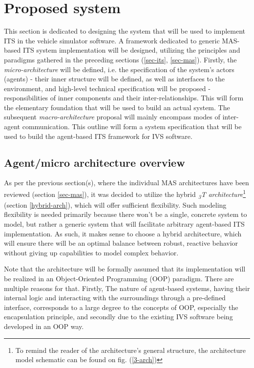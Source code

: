 \documentclass[main.tex]{subfiles}
\begin{document}
    
\section{Proposed system}\label{sec-system}

This section is dedicated to designing the system that will be used to implement ITS in the
vehicle simulator software. A framework dedicated to generic MAS-based ITS system
implementation will be designed, utilizing the principles and paradigms gathered in the
preceding sections (\ref{sec-its}, \ref{sec-mas}). Firstly, the \emph{micro-architecture} will be
defined, i.e. the specification of the system's actors (agents) - their inner structure 
will be defined, as well as interfaces to the environment, and high-level technical specification 
will be proposed - responsibilities of inner components and their inter-relationships.
This will form the elementary foundation that will be used to build an actual system.
The subsequent \emph{macro-architecture} proposal will mainly encompass modes of inter-
agent communication. This outline will form a system specification that will be used 
to build the agent-based ITS framework for IVS software.

\subsection{Agent/micro architecture overview}

As per the previous section(s), where the individual MAS architectures have been reviewed
(section \ref{sec-mas}), it was decided to utilize the hybrid \emph{\textsubscript{3}T
architecture}\footnote{To remind the reader of the architecture's general structure, the
architecture model schematic can be found on fig. (\ref{3-arch}) } (section \ref{hybrid-arch}),
which will offer sufficient flexibility.  Such modeling flexibility is needed primarily because
there won't be a single, concrete system to model, but rather a generic system that will
facilitate arbitrary agent-based ITS implementation. As such, it makes sense to choose a hybrid
architecture, which will ensure there will be an optimal balance between robust, reactive
behavior without giving up capabilities to model complex behavior.

Note that the architecture will be formally assumed that its implementation will be realized 
in an Object-Oriented Programming (OOP) paradigm. There are multiple reasons for that. Firstly, 
The nature of agent-based systems, having their internal logic and interacting with the surroundings 
through a pre-defined interface, corresponds to a large degree to the concepts of OOP, especially
the encapsulation principle, and secondly due to the existing IVS software being developed in 
an OOP way.
\end{document}
